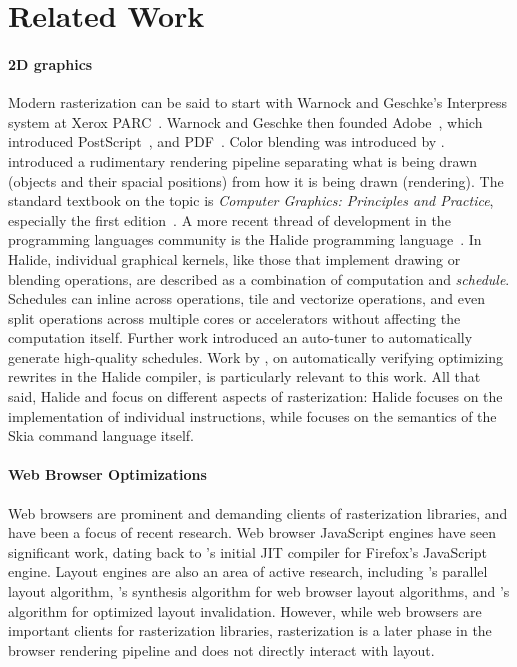 \documentclass[main.tex]{subfiles}
\begin{document}
\section{Related Work}
\label{sec:related}


\paragraph{2D graphics}

Modern rasterization can be said to start with
  Warnock and Geschke's Interpress system at Xerox PARC~\cite{interpress}.
Warnock and Geschke then founded Adobe~\cite{about-adobe},
  which introduced PostScript~\cite{postscript}, and PDF~\cite{pdf}.
Color blending was introduced by \citet{blendmodes}.
\citet{pipeline} introduced a rudimentary rendering pipeline
  separating what is being drawn (objects and their spacial positions)
  from how it is being drawn (rendering).
The standard textbook on the topic is
  \textit{Computer Graphics: Principles and Practice},
  especially the first edition~\cite{cgpp}.
A more recent thread of development
  in the programming languages community
  is the Halide programming language~\cite{halide}.
In Halide, individual graphical kernels,
  like those that implement drawing or blending operations,
  are described as a combination of computation and \emph{schedule}.
Schedules can inline across operations, tile and vectorize operations,
  and even split operations across multiple cores or accelerators
  without affecting the computation itself.
Further work \citep{halide-auto, halide-tree}
  introduced an auto-tuner to automatically generate high-quality schedules.
Work by \citet{halide-verif},
  on automatically verifying optimizing rewrites in the Halide compiler,
  is particularly relevant to this work.
All that said, Halide and \muskia focus on different aspects of rasterization:
  Halide focuses on the implementation of individual instructions,
  while \muskia focuses on the semantics of the Skia command language itself.

\paragraph{Web Browser Optimizations}
Web browsers are prominent and demanding clients of rasterization libraries,
  and have been a focus of recent research.
Web browser JavaScript engines have seen significant work,
  dating back to  \citet{tracemonkey}'s initial JIT compiler
  for Firefox's JavaScript engine.
Layout engines are also an area of active research,
  including \citet{parlayout}'s parallel layout algorithm,
  \citet{layoutsynth}'s synthesis algorithm for web browser layout algorithms,
  and \citet{spineless}'s algorithm for optimized layout invalidation.
However, while web browsers are important clients for rasterization libraries,
  rasterization is a later phase in the browser rendering pipeline
  and does not directly interact with layout.
\end{document}
